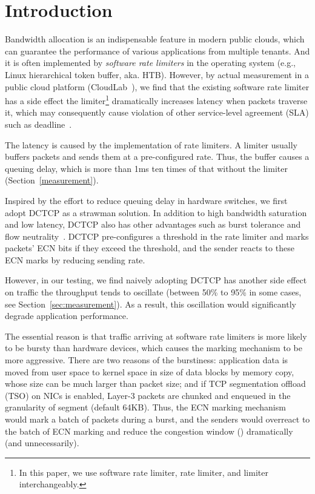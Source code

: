 \section{Introduction}
\label{sec:introduction} 

Bandwidth allocation is an indispensable feature in modern public clouds, which can guarantee the performance of various applications from multiple tenants. And it is often implemented by \textit{software rate limiters} in the operating system (e.g., Linux hierarchical token buffer, aka. HTB). However, by actual measurement in a public cloud platform (CloudLab~\cite{cloudlab}), we find that the existing software rate limiter has a side effect \textemdash\xspace the limiter\footnote{In this paper, we use software rate limiter, rate limiter, and limiter interchangeably.} dramatically increases latency when packets traverse it, which may consequently cause violation of other service-level agreement (SLA) such as deadline~\cite{d3}.

The latency is caused by the implementation of rate limiters. A limiter usually buffers packets and sends them at a pre-configured rate.  Thus, the buffer causes a queuing delay, which is more than 1ms \textemdash\xspace ten times of that without the limiter (Section~\ref{measurement}). 

Inspired by the effort to reduce queuing delay in hardware switches, we first adopt DCTCP as a strawman solution. In addition to high bandwidth saturation and low latency, DCTCP also has other advantages such as burst tolerance and flow neutrality~\cite{kai}. DCTCP pre-configures a threshold in the rate limiter and marks packets' ECN bits if they exceed the threshold, and the sender reacts to these ECN marks by reducing sending rate. 

However, in our testing, we find naively adopting DCTCP has another side effect on traffic \textemdash\xspace the throughput tends to oscillate (between 50\% to 95\% in some cases, see Section~\ref{sec:measurement}). As a result, this oscillation would significantly degrade application performance. 

The essential reason is that traffic arriving at software rate limiters is more likely to be bursty than hardware devices, which causes the marking mechanism to be more aggressive. There are two reasons of the burstiness: application data is moved from user space to kernel space in size of data blocks by memory copy, whose size can be much larger than packet size; and if TCP segmentation offload (TSO) on NICs is enabled, Layer-3 packets are chunked and enqueued in the granularity of segment (default 64KB). Thus, the ECN marking mechanism would mark a batch of packets during a burst, and the senders would overreact to the batch of ECN marking and reduce the congestion window (\cwnd) dramatically (and unnecessarily).

